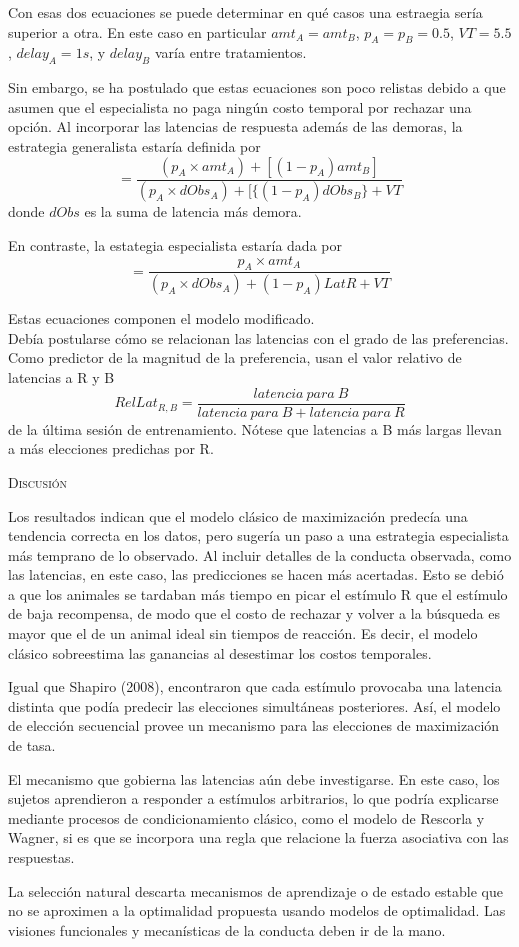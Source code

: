 \documentclass[a4paper,12pt]{article}
\begin{document}
Con esas dos ecuaciones se puede determinar en qué casos una estraegia sería superior a otra. En este caso en particular $amt_A=amt_B$, $p_A=p_B=0{.}5$, $VT=5{.}5$, $delay_A=1s$, y $delay_B$ varía entre tratamientos.

Sin embargo, se ha postulado que estas ecuaciones son poco relistas debido a que asumen que el especialista no paga ningún costo temporal por rechazar una opción. Al incorporar las latencias de respuesta además de las demoras, la estrategia generalista estaría definida por
$$=\frac{(p_A\times amt_A)+[(1-p_A)amt_B]}{(p_A\times dObs_A)+[\{(1-p_A)dObs_B\}+VT}$$ donde $dObs$ es la suma de latencia más demora.

En contraste, la estategia especialista estaría dada por
$$=\frac{p_A\times amt_A}{(p_A\times dObs_A)+(1-p_A)LatR+VT}$$

Estas ecuaciones componen el modelo modificado.
\\

Debía postularse cómo se relacionan las latencias con el grado de las preferencias. Como predictor de la magnitud de la preferencia, usan el valor relativo de latencias a R y B $$RelLat_{R,B}=\frac{latencia\ para\ B}{latencia\ para\ B + latencia\ para\ R}$$ de la última sesión de entrenamiento. Nótese que latencias a B más largas llevan a más elecciones predichas por R.

{\scshape Discusión}

Los resultados indican que el modelo clásico de maximización predecía una tendencia correcta en los datos, pero sugería un paso a una estrategia especialista más temprano de lo observado. Al incluir detalles de la conducta observada, como las latencias, en este caso, las predicciones se hacen más acertadas. Esto se debió a que los animales se tardaban más tiempo en picar el estímulo R que el estímulo de baja recompensa, de modo que el costo de rechazar y volver a la búsqueda es mayor que el de un animal ideal sin tiempos de reacción. Es decir, el modelo clásico sobreestima las ganancias al desestimar los costos temporales. 

Igual que Shapiro (2008), encontraron que cada estímulo provocaba una latencia distinta que podía predecir las elecciones simultáneas posteriores. Así, el modelo de elección secuencial provee un mecanismo para las elecciones de maximización de tasa.

El mecanismo que gobierna las latencias aún debe investigarse. En este caso, los sujetos aprendieron a responder a estímulos arbitrarios, lo que podría explicarse mediante procesos de condicionamiento clásico, como el modelo de Rescorla y Wagner, si es que se incorpora una regla que relacione la fuerza asociativa con las respuestas.

La selección natural descarta mecanismos de aprendizaje o de estado estable que no se aproximen a la optimalidad propuesta usando modelos de optimalidad. Las visiones funcionales y mecanísticas de la conducta deben ir de la mano.
\end{document}
